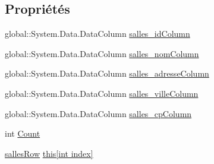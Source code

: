 \subsection*{Propriétés}
\begin{DoxyCompactItemize}
\item 
global\+::\+System.\+Data.\+Data\+Column \hyperlink{classforma_1_1formadb_data_set_1_1salles_data_table_a7e2a067942611d85c1247ddfdc6fed9f}{salles\+\_\+id\+Column}
\item 
global\+::\+System.\+Data.\+Data\+Column \hyperlink{classforma_1_1formadb_data_set_1_1salles_data_table_a515faf4ec0e880db72c4689c82bd8768}{salles\+\_\+nom\+Column}
\item 
global\+::\+System.\+Data.\+Data\+Column \hyperlink{classforma_1_1formadb_data_set_1_1salles_data_table_accf83607c923ff63b92d92a93905f3d3}{salles\+\_\+adresse\+Column}
\item 
global\+::\+System.\+Data.\+Data\+Column \hyperlink{classforma_1_1formadb_data_set_1_1salles_data_table_a0f28fd1e6e08c0fadda9cf349737d672}{salles\+\_\+ville\+Column}
\item 
global\+::\+System.\+Data.\+Data\+Column \hyperlink{classforma_1_1formadb_data_set_1_1salles_data_table_a24b6dac562273dbbe9fb02e4e7dd7bcf}{salles\+\_\+cp\+Column}
\item 
int \hyperlink{classforma_1_1formadb_data_set_1_1salles_data_table_a3ff12a9c31b323a7a10aff7df6ee250d}{Count}
\item 
\hyperlink{classforma_1_1formadb_data_set_1_1salles_row}{salles\+Row} \hyperlink{classforma_1_1formadb_data_set_1_1salles_data_table_a9c1f449ab66208c553df987f297797f1}{this\mbox{[}int index\mbox{]}}
\end{DoxyCompactItemize}
